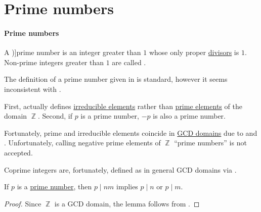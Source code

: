 \section{Prime numbers}\label{sec:prime_numbers}

\paragraph{Prime numbers}

\begin{definition}\label{def:prime_number}
  A \term[ru=простое число (\cite[45]{Зорич2019АнализЧасть1})]{prime number} is an integer greater than \( 1 \) whose only  proper \hyperref[def:divisibility]{divisors} is \( 1 \). Non-prime integers greater than \( 1 \) are called .
\end{definition}

\begin{remark}\label{rem:prime_numbers_and_prime_elements}
  The definition of a prime number given in  is standard, however it seems inconsistent with .

  First,  actually defines \hyperref[def:domain_divisibility/irreducible]{irreducible elements} rather than \hyperref[def:domain_divisibility/prime]{prime elements} of the domain \( \BbbZ \). Second, if \( p \) is a prime number, \( -p \) is also a prime number.

  Fortunately, prime and irreducible elements coincide in \hyperref[def:gcd_domain]{GCD domains} due to  and . Unfortunately, calling negative prime elements of \( \BbbZ \) \enquote{prime numbers} is not accepted.

  Coprime integers are, fortunately, defined as in general GCD domains via .
\end{remark}

\begin{lemma}\label{thm:euclids_lemma}
  If \( p \) is a \hyperref[def:prime_number]{prime number}, then \( p \mid nm \) implies \( p \mid n \) or \( p \mid m \).
\end{lemma}
\begin{proof}
  Since \( \BbbZ \) is a GCD domain, the lemma follows from .
\end{proof}

